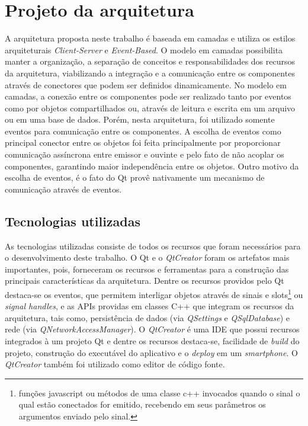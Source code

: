 \section{Projeto da arquitetura}
A arquitetura proposta neste trabalho é baseada em camadas e utiliza os estilos arquiteturais \textit{Client-Server} e \textit{Event-Based}. O modelo em camadas possibilita manter a organização, a separação de conceitos e responsabilidades dos recursos da arquitetura, viabilizando a integração e a comunicação entre os componentes através de conectores que podem ser definidos dinamicamente. No modelo em camadas, a conexão entre os componentes pode ser realizado tanto por eventos como por objetos compartilhados ou, através de leitura e escrita em um arquivo ou em uma base de dados. Porém, nesta arquitetura, foi utilizado somente eventos para comunicação entre os componentes. A escolha de eventos como principal conector entre os objetos foi feita principalmente por proporcionar comunicação assíncrona entre emissor e ouvinte e pelo fato de não acoplar os componentes, garantindo maior independência entre os objetos. Outro motivo da escolha de eventos, é o fato do Qt provê nativamente um mecanismo de comunicação através de eventos.\par


\subsection{Tecnologias utilizadas}
As tecnologias utilizadas consiste de todos os recursos que foram necessários para o desenvolvimento deste trabalho. O Qt e o \textit{QtCreator} foram os artefatos mais importantes, pois, forneceram os recursos e ferramentas para a construção das principais características da arquitetura. Dentre os recursos providos pelo Qt destaca-se os eventos, que permitem interligar objetos através de sinais e slots\footnote{funções javascript ou métodos de uma classe c++ invocados quando o sinal o qual estão conectados for emitido, recebendo em seus parâmetros os argumentos enviado pelo sinal.} ou \textit{signal handles}, e as APIs providas em classes C++ que integram os recursos da arquitetura, tais como, persistência de dados (via \textit{QSettings} e \textit{QSqlDatabase}) e rede (via \textit{QNetworkAccessManager}). O \textit{QtCreator} é uma IDE que possui recursos integrados à um projeto Qt e dentre os recursos destaca-se, facilidade de \textit{build} do projeto, construção do executável do aplicativo e o \textit{deploy} em um \textit{smartphone}. O \textit{QtCreator} também foi utilizado como editor de código fonte.


